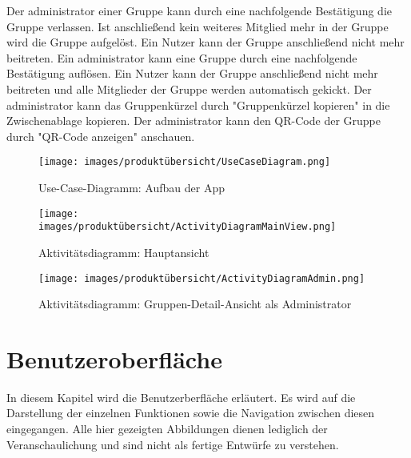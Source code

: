 \documentclass[parskip=full]{scrartcl}
\newcommand{\changelocaltocdepth}[1]{%
  \addtocontents{toc}{\protect\setcounter{tocdepth}{#1}}%
  \setcounter{tocdepth}{#1}%
}
\newcommand{\enablesubsectionnumbering}[1]{
    \renewcommand{\thesubsection}{$\langle$#1\arabic{subsection}0$\rangle$}
    \changelocaltocdepth{1} 
}
\begin{document}
Der \Gls{administrator} einer Gruppe kann durch eine nachfolgende Bestätigung die Gruppe verlassen.
Ist anschließend kein weiteres Mitglied mehr in der Gruppe wird die Gruppe aufgelöst. Ein Nutzer kann der Gruppe anschließend nicht mehr beitreten.
Ein \Gls{administrator} kann eine Gruppe durch eine nachfolgende Bestätigung auflösen. Ein Nutzer kann der Gruppe anschließend nicht mehr beitreten und alle Mitglieder der Gruppe werden automatisch gekickt.\newline
Der \Gls{administrator} kann das Gruppenkürzel durch "Gruppenkürzel kopieren" in die Zwischenablage kopieren. Der \Gls{administrator} kann den QR-Code der Gruppe durch "QR-Code anzeigen" anschauen.

\newpage

\begin{figure}[!htp]
    \centering
    \begin{adjustbox}{right=160mm}
        \texttt{[image: images/produktübersicht/UseCaseDiagram.png]}
    \end{adjustbox}
    \caption{Use-Case-Diagramm: Aufbau der App}
    \label{fig:UseCaseDiagram}
\end{figure}
\newpage

\begin{figure}[!htp]
    \centering
    \texttt{[image: images/produktübersicht/ActivityDiagramMainView.png]}
    \caption{Aktivitätsdiagramm: Hauptansicht}
    \label{fig:ActivityDiagramMainView}
\end{figure}
\newpage

\begin{figure}[!htp]
    \centering
    \begin{adjustbox}{right=150mm}
        \texttt{[image: images/produktübersicht/ActivityDiagramAdmin.png]}
    \end{adjustbox}

    \caption{Aktivitätsdiagramm: Gruppen-Detail-Ansicht als Administrator}
    \label{fig:ActivityDiagramAdmin}
\end{figure}
\newpage

\section{ Benutzeroberfläche }
\enablesubsectionnumbering{UI}
In diesem Kapitel wird die Benutzerberfläche erläutert. Es wird auf die Darstellung der einzelnen Funktionen sowie die Navigation zwischen diesen eingegangen. Alle hier gezeigten Abbildungen dienen lediglich der Veranschaulichung und sind nicht als fertige Entwürfe zu verstehen.
\end{document}
